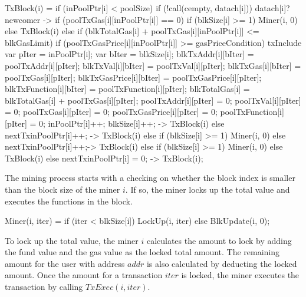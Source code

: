 \documentclass{KERauth}
\begin{document}
\begin{center}
\begin{boxedverbatim}
TxBlock(i) =
  if (inPoolPtr[i] < poolSize) {
    if (!call(cempty, datach[i])) {
      datach[i]?newcomer ->
      if (poolTxGas[i][inPoolPtr[i]] == 0) {
        if (blkSize[i] >= 1) {
          Miner(i, 0)}
        else { TxBlock(i) }	}
      else {
        if (blkTotalGas[i] + poolTxGas[i][inPoolPtr[i]] <= blkGasLimit) {
          if (poolTxGasPrice[i][inPoolPtr[i]] >= gasPriceCondition) {
            txInclude{
              var pIter = inPoolPtr[i];
              var bIter = blkSize[i];
              blkTxAddr[i][bIter] = poolTxAddr[i][pIter];
              blkTxVal[i][bIter] = poolTxVal[i][pIter];
              blkTxGas[i][bIter] = poolTxGas[i][pIter];
              blkTxGasPrice[i][bIter] = poolTxGasPrice[i][pIter];
              blkTxFunction[i][bIter] = poolTxFunction[i][pIter];
              blkTotalGas[i] = blkTotalGas[i] + poolTxGas[i][pIter];
              poolTxAddr[i][pIter] = 0;
              poolTxVal[i][pIter] = 0;
              poolTxGas[i][pIter] = 0;
              poolTxGasPrice[i][pIter] = 0;
              poolTxFunction[i][pIter] = 0;
              inPoolPtr[i]++;
              blkSize[i]++;} ->
            TxBlock(i)}
          else {nextTx{inPoolPtr[i]++;} ->
        TxBlock(i)}}
      else if (blkSize[i] >= 1) {Miner(i, 0)}
      else {nextTx{inPoolPtr[i]++;}->
      TxBlock(i)}}}
    else if (blkSize[i] >= 1) {Miner(i, 0)}
    else { TxBlock(i) }}
  else {nextTx{inPoolPtr[i] = 0;} -> TxBlock(i)};
\end{boxedverbatim}
\end{center}

The mining process starts with a checking on whether the block index is smaller than the block size of the miner $i$. If so, the miner locks up the total value and executes the functions in the block.

\begin{center}
\begin{boxedverbatim}
Miner(i, iter) = if (iter < blkSize[i]) {LockUp(i, iter)}
                 else { BlkUpdate(i, 0)};
\end{boxedverbatim}
\end{center}

To lock up the total value, the miner $i$ calculates the amount to lock by adding the fund value and the gas value as the locked total amount. The remaining amount for the user with address $addr$ is also calculated by deducting the locked amount. Once the amount for a transaction $iter$ is locked, the miner executes the transaction by calling $TxExec(i, iter)$.
\end{document}

